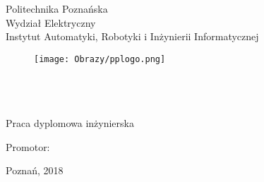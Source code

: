 \thispagestyle{empty}
\setcounter{page}{0}
\begin{center}
	\vspace{-10mm}
Politechnika Poznańska\\
Wydział Elektryczny\\  
Instytut Automatyki, Robotyki i Inżynierii Informatycznej\\
  \vspace{8mm}
\begin{figure}[ht!]
\centering
\texttt{[image: Obrazy/pplogo.png]}
\end{figure}
  \vspace{8mm}
\Large{\StudentA}\\
\Large{\StudentB}\\
  \vspace{10mm}
\LARGE{\TytulPolski}\\
  \vspace{10mm}
\Large{Praca dyplomowa inżynierska}\\
\end{center}
\vspace{40mm}
\begin{flushright}
{\large Promotor:\\
\Promotor}
\end{flushright}

\vspace{15mm}
\begin{center}
Poznań, 2018
\end{center}
 
